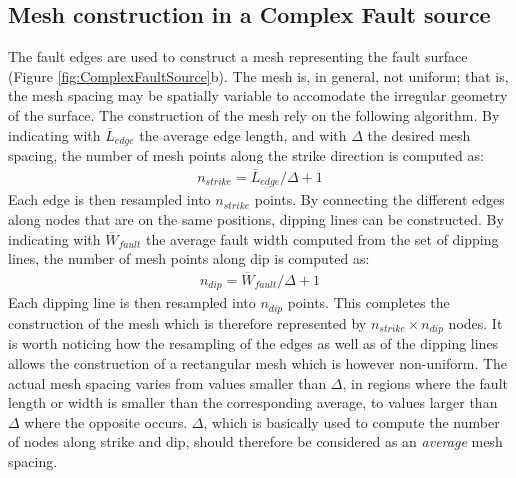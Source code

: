 \subsection{Mesh construction in a Complex Fault source}
The fault edges are used to construct a mesh representing the fault surface 
(Figure \ref{fig:ComplexFaultSource}b). The mesh is, in general, not uniform; that is,
the mesh spacing may be spatially variable to accomodate the irregular geometry of the surface.
The construction of the mesh rely on the following algorithm. By indicating with
$\overline{L}_{edge}$ the average edge length, and with $\Delta$
the desired mesh spacing, the number of mesh points along the strike direction is computed as:
\begin{align}
n_{strike} = \overline{L}_{edge} / \Delta + 1
\end{align}
Each edge is then resampled into $n_{strike}$ points. By connecting the different edges along
nodes that are on the same positions, dipping lines can be constructed. By indicating with
$\overline{W}_{fault}$ the average fault width computed from the set of dipping lines, the
number of mesh points along dip is computed as:
\begin{align}
n_{dip} = \overline{W}_{fault}/  \Delta + 1
\end{align}
Each dipping line is then resampled into $n_{dip}$ points. This completes the construction of
the mesh which is therefore represented by $n_{strike} \times n_{dip}$ nodes. It is worth noticing
how the resampling of the edges as well as of the dipping lines allows the construction of a rectangular
mesh which is however non-uniform. The actual mesh spacing varies from values smaller than $\Delta$,
in regions where the fault length or width is smaller than the corresponding average, to values larger than
$\Delta$ where the opposite occurs. $\Delta$, which is basically used to compute the number of nodes along
strike and dip, should therefore be considered as an \textit{average} mesh spacing.

